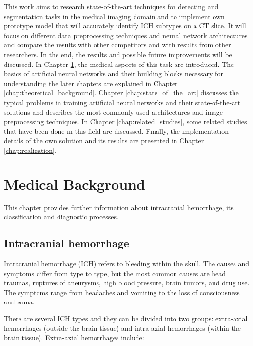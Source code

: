 \documentclass[thesis=B,english]{FITthesis}[2019/12/23]
\begin{document}
This work aims to research state-of-the-art techniques for detecting and segmentation tasks in the medical imaging domain and to implement own prototype model that will accurately identify ICH subtypes on a CT slice. It will focus on different data preprocessing techniques and neural network architectures and compare the results with other competitors and with results from other researchers. In the end, the results and possible future improvements will be discussed.
\newpage
In Chapter \ref{chap:medical_background}, the medical aspects of this task are introduced. The basics of artificial neural networks and their building blocks necessary for understanding the later chapters are explained in Chapter \ref{chap:theoretical_background}. Chapter \ref{chap:state_of_the_art} discusses the typical problems in training artificial neural networks and their state-of-the-art solutions and describes the most commonly used architectures and image preprocessing techniques. In Chapter \ref{chap:related_studies}, some related studies that have been done in this field are discussed. Finally, the implementation details of the own solution and its results are presented in Chapter \ref{chap:realization}.




\chapter{Medical Background}
\label{chap:medical_background}
This chapter provides further information about intracranial hemorrhage, its classification and diagnostic processes.
\section{Intracranial hemorrhage}
Intracranial hemorrhage (ICH) refers to bleeding within the skull. The causes and symptoms differ from type to type, but the most common causes are head traumas, ruptures of aneurysms, high blood pressure, brain tumors, and drug use. The symptoms range from headaches and vomiting to the loss of consciousness and coma.\cite{naidich2012imaging}

There are several ICH types and they can be divided into two groups: extra-axial hemorrhages (outside the brain tissue) and intra-axial hemorrhages (within the brain tissue). Extra-axial hemorrhages include:
\end{document}
